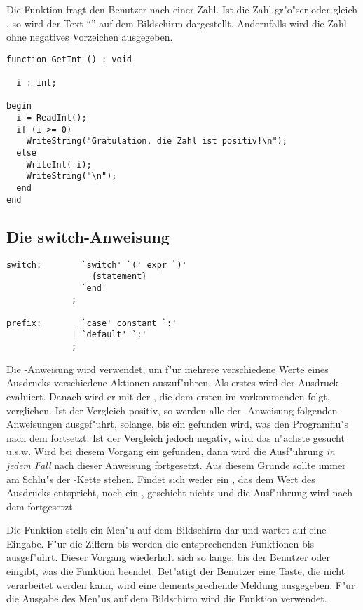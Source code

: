 \example
Die Funktion  fragt den Benutzer nach einer Zahl.
Ist die Zahl gr"o"ser oder gleich  , so wird der Text
"`"'
auf dem Bildschirm dargestellt. Andernfalls wird die Zahl ohne
negatives Vorzeichen ausgegeben.

\begin{verbatim}
function GetInt () : void

  i : int;

begin
  i = ReadInt();
  if (i >= 0)
    WriteString("Gratulation, die Zahl ist positiv!\n");
  else
    WriteInt(-i);
    WriteString("\n");
  end
end
\end{verbatim}

\subsection{Die switch-Anweisung}

\begin{verbatim}
switch:        `switch' `(' expr `)'
                 {statement}
               `end'
             ;

prefix:        `case' constant `:'
             | `default' `:'
             ;
\end{verbatim}

Die -Anweisung wird verwendet, um f"ur mehrere
verschiedene Werte eines Ausdrucks
verschiedene Aktionen
auszuf"uhren. Als erstes wird der Ausdruck evaluiert. Danach
wird er mit der , die dem ersten im
 vorkommenden  folgt, verglichen. Ist
der Vergleich positiv, so werden alle der -Anweisung
folgenden Anweisungen ausgef"uhrt, solange, bis ein 
gefunden wird, was den Programflu"s nach dem  fortsetzt.
Ist der Vergleich jedoch negativ, wird das n"achste 
gesucht u.s.w. Wird bei diesem Vorgang ein  gefunden,
dann wird die Ausf"uhrung {\em in jedem Fall} nach dieser
Anweisung fortgesetzt. Aus diesem Grunde sollte 
immer am Schlu"s der -Kette stehen.
Findet sich weder ein , das dem
Wert des Ausdrucks entspricht, noch ein , geschieht
nichts und die Ausf"uhrung wird nach dem  fortgesetzt.

\example
Die Funktion  stellt ein Men"u auf
dem Bildschirm dar und wartet auf eine Eingabe. F"ur die Ziffern
 bis  werden die entsprechenden Funktionen
 bis 
ausgef"uhrt. Dieser Vorgang
wiederholt sich so lange, bis der Benutzer  oder 
eingibt, was die Funktion beendet. Bet"atigt der Benutzer eine
Taste, die nicht verarbeitet werden kann, wird eine
dementsprechende Meldung ausgegeben. F"ur die Ausgabe des Men"us
auf dem Bildschirm wird die Funktion  verwendet.

